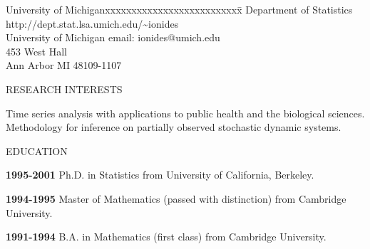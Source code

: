 \renewcommand{\labelitemi}{\bf --}
\newcommand{\lsp}{\vspace{0.2cm}}
\newcommand{\isp}{\vspace{0.0cm}}


\thispagestyle{empty}  %


\rule{0mm}{1mm}
\vspace{-20mm}


\vspace{1mm}

\rule{0mm}{1mm}


\begin{tabbing}
University of Michiganxxxxxxxxxxxxxxxxxxxxxxxxxx\= \kill
Department of Statistics \>  %
{http://dept.stat.lsa.umich.edu/\~{}ionides}
\\
University of Michigan\> %
email: {ionides@umich.edu}
\\
453 West Hall    \>  \\
Ann Arbor MI 48109-1107 \> 
\end{tabbing}
\vspace{0.1cm}
\begin{mylist}{RESEARCH INTERESTS}
\item{} 
Time series analysis with applications to public health and the biological sciences. Methodology for inference on partially observed stochastic dynamic systems. 
\end{mylist}

\vspace{0.2cm}
\begin{mylist}{EDUCATION}
\item{\bf 1995-2001 }
{Ph.D. in Statistics} from University of California, Berkeley.

\item{\bf 1994-1995 }
{Master of Mathematics (passed with distinction)} from Cambridge University. 

\item{\bf 1991-1994 }
{B.A.  in Mathematics (first class)} from Cambridge
  University.

\end{mylist}

